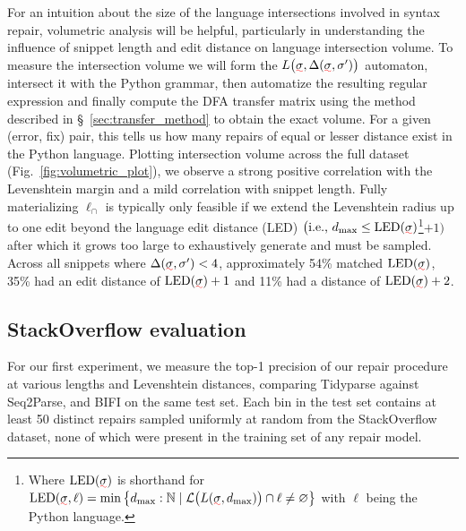 \documentclass[sigplan,review,acmsmall,nonacm,screen,anonymous]{acmart}\settopmatter{printfolios=false,printccs=false,printacmref=false}
\begin{document}
For an intuition about the size of the language intersections involved in syntax repair, volumetric analysis will be helpful, particularly in understanding the influence of snippet length and edit distance on language intersection volume. To measure the intersection volume we will form the $L\big(\err\sigma, \Delta(\err{\sigma}, \sigma')\big)$ automaton, intersect it with the Python grammar, then automatize the resulting regular expression and finally compute the DFA transfer matrix using the method described in \S~\ref{sec:transfer_method} to obtain the exact volume. For a given (error, fix) pair, this tells us how many repairs of equal or lesser distance exist in the Python language. Plotting intersection volume across the full dataset (Fig.~\ref{fig:volumetric_plot}), we observe a strong positive correlation with the Levenshtein margin and a mild correlation with snippet length. Fully materializing $\ell_\cap$ is typically only feasible if we extend the Levenshtein radius up to one edit beyond the language edit distance (LED) $\big(\text{i.e., } d_{\max} \leq \text{LED}(\err\sigma)$\footnote{Where $\text{LED}(\err\sigma)$ is shorthand for $\text{LED}(\err\sigma, \ell) = \min \big\{d_{\max}: \mathbb{N}\mid \mathcal{L}\big(L(\err\sigma, d_{\max})\big) \cap \ell \neq \varnothing\big\}$ with $\ell$ being the Python language.}$+ 1\big)$ after which it grows too large to exhaustively generate and must be sampled. Across all snippets where $\Delta(\err{\sigma}, \sigma') < 4$, approximately 54\% matched $\text{LED}(\err\sigma)$, 35\% had an edit distance of $\text{LED}(\err\sigma) + 1$ and 11\% had a distance of $\text{LED}(\err\sigma) + 2$.

\clearpage\subsection{StackOverflow evaluation}\label{sec:rq2}

For our first experiment, we measure the top-1 precision of our repair procedure at various lengths and Levenshtein distances, comparing Tidyparse against Seq2Parse, and BIFI on the same test set. Each bin in the test set contains at least 50 distinct repairs sampled uniformly at random from the StackOverflow dataset, none of which were present in the training set of any repair model.\vspace{-0.2cm}
\end{document}
